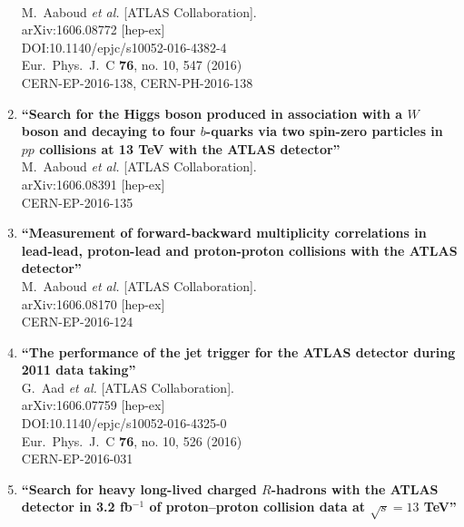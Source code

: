 \documentclass{article}
\begin{document}
\begin{enumerate}
  \\{}M.~Aaboud {\it et al.} [ATLAS Collaboration].
  \\{}arXiv:1606.08772 [hep-ex]
  \\{}DOI:10.1140/epjc/s10052-016-4382-4
  \\{}Eur.\ Phys.\ J.\ C {\bf 76}, no. 10, 547 (2016)
  \\{}CERN-EP-2016-138, CERN-PH-2016-138
\item%
{\bf ``Search for the Higgs boson produced in association with a $W$ boson and decaying to four $b$-quarks via two spin-zero particles in $pp$ collisions at 13 TeV with the ATLAS detector''}
  \\{}M.~Aaboud {\it et al.} [ATLAS Collaboration].
  \\{}arXiv:1606.08391 [hep-ex]
  \\{}CERN-EP-2016-135
\item%
{\bf ``Measurement of forward-backward multiplicity correlations in lead-lead, proton-lead and proton-proton collisions with the ATLAS detector''}
  \\{}M.~Aaboud {\it et al.} [ATLAS Collaboration].
  \\{}arXiv:1606.08170 [hep-ex]
  \\{}CERN-EP-2016-124
\item%
{\bf ``The performance of the jet trigger for the ATLAS detector during 2011 data taking''}
  \\{}G.~Aad {\it et al.} [ATLAS Collaboration].
  \\{}arXiv:1606.07759 [hep-ex]
  \\{}DOI:10.1140/epjc/s10052-016-4325-0
  \\{}Eur.\ Phys.\ J.\ C {\bf 76}, no. 10, 526 (2016)
  \\{}CERN-EP-2016-031
\item%
{\bf ``Search for heavy long-lived charged $R$-hadrons with the ATLAS detector in 3.2 fb$^{-1}$ of proton--proton collision data at $\sqrt{s} = 13$ TeV''}

\end{enumerate}
\end{document}
